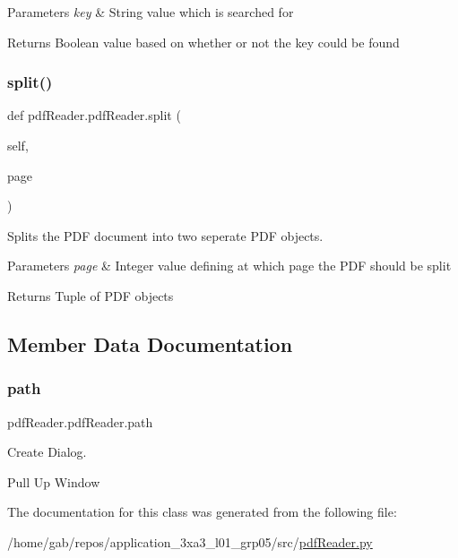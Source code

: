 \begin{DoxyParams}{Parameters}
{\em key} & String value which is searched for \\
\hline
\end{DoxyParams}
\begin{DoxyReturn}{Returns}
Boolean value based on whether or not the key could be found 
\end{DoxyReturn}
\mbox{\label{classpdfReader_1_1pdfReader_a776e5464f4d9d5f1e2164810e50e471b}} 
\subsubsection{\texorpdfstring{split()}{split()}}
{\footnotesize\ttfamily def pdf\+Reader.\+pdf\+Reader.\+split (\begin{DoxyParamCaption}\item[{}]{self,  }\item[{}]{page }\end{DoxyParamCaption})}



Splits the P\+DF document into two seperate P\+DF objects. 


\begin{DoxyParams}{Parameters}
{\em page} & Integer value defining at which page the P\+DF should be split \\
\hline
\end{DoxyParams}
\begin{DoxyReturn}{Returns}
Tuple of P\+DF objects 
\end{DoxyReturn}


\subsection{Member Data Documentation}
\mbox{\label{classpdfReader_1_1pdfReader_a37a7c7f6730fcc766decf0ab476d3549}} 
\subsubsection{\texorpdfstring{path}{path}}
{\footnotesize\ttfamily pdf\+Reader.\+pdf\+Reader.\+path}



Create Dialog. 

Pull Up Window 

The documentation for this class was generated from the following file\+:\begin{DoxyCompactItemize}
\item 
/home/gab/repos/application\+\_\+3xa3\+\_\+l01\+\_\+grp05/src/\hyperlink{pdfReader_8py}{pdf\+Reader.\+py}\end{DoxyCompactItemize}
